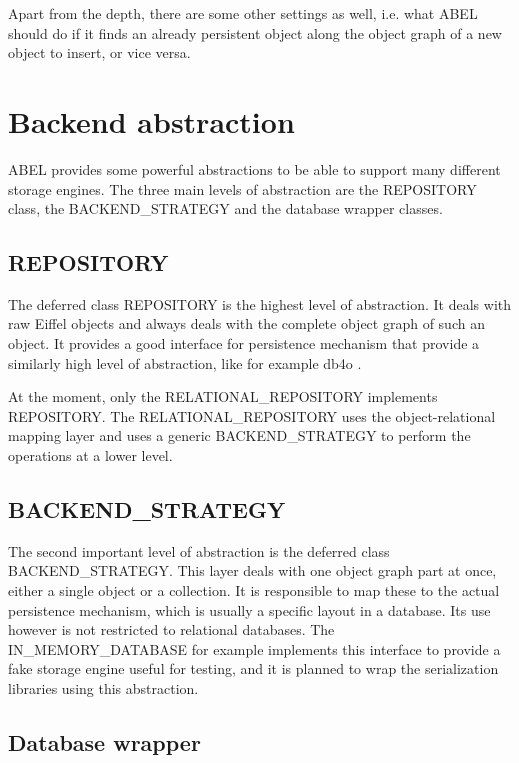Apart from the depth, there are some other settings as well, i.e. what ABEL should do if it finds an already persistent object along the object graph of a new object to insert, or vice versa.

\section{Backend abstraction}

ABEL provides some powerful abstractions to be able to support many different storage engines. 
The three main levels of abstraction are the REPOSITORY class, the BACKEND\_STRATEGY and the database wrapper classes.

\subsection{REPOSITORY}

The deferred class REPOSITORY is the highest level of abstraction.
It deals with raw Eiffel objects and always deals with the complete object graph of such an object.
It provides a good interface for persistence mechanism that provide a similarly high level of abstraction, like for example db4o .

At the moment, only the RELATIONAL\_REPOSITORY implements REPOSITORY.
The RELATIONAL\_REPOSITORY uses the object-relational mapping layer and uses a generic BACKEND\_STRATEGY to perform the operations at a lower level.

\subsection{BACKEND\_STRATEGY}

The second important level of abstraction is the deferred class BACKEND\_STRATEGY.
This layer deals with one object graph part at once, either a single object or a collection.
It is responsible to map these to the actual persistence mechanism, which is usually a specific layout in a database.
Its use however is not restricted to relational databases.
The IN\_MEMORY\_DATABASE for example implements this interface to provide a fake storage engine useful for testing, and it is planned to wrap the serialization libraries using this abstraction.

\subsection{Database wrapper}


